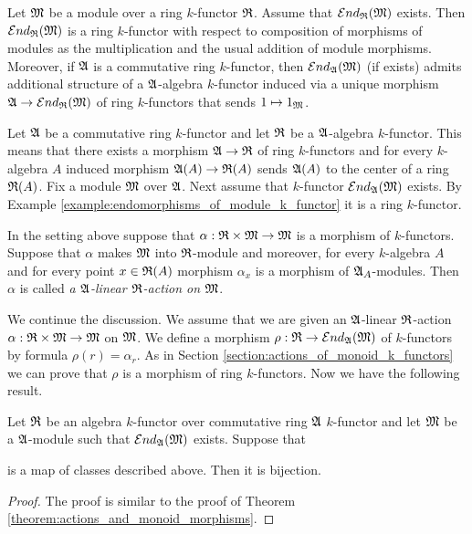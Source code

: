\begin{example}\label{example:endomorphisms_of_module_k_functor}
Let ${\mathfrak M}$ be a module over a ring $k$-functor ${\mathfrak R}$. Assume that ${\mathcal E} nd_{{\mathfrak R}}({\mathfrak M})$ exists. Then ${\mathcal E} nd_{{\mathfrak R}}({\mathfrak M})$ is a ring $k$-functor with respect to composition of morphisms of modules as the multiplication and the usual addition of module morphisms. Moreover, if ${\mathfrak A}$ is a commutative ring $k$-functor, then ${\mathcal E} nd_{{\mathfrak A}}({\mathfrak M})$ (if exists) admits additional structure of a ${\mathfrak A}$-algebra $k$-functor induced via a unique morphism ${\mathfrak A}\rightarrow {\mathcal E} nd_{{\mathfrak R}}({\mathfrak M})$ of ring $k$-functors that sends $1\mapsto 1_{{\mathfrak M}}$.
\end{example}
\noindent
Let ${\mathfrak A}$ be a commutative ring $k$-functor and let ${\mathfrak R}$ be a ${\mathfrak A}$-algebra $k$-functor. This means that there exists a morphism ${\mathfrak A}\rightarrow {\mathfrak R}$ of ring $k$-functors and for every $k$-algebra $A$ induced morphism ${\mathfrak A}(A)\rightarrow {\mathfrak R}(A)$ sends ${\mathfrak A}(A)$ to the center of a ring ${\mathfrak R}(A)$. Fix a module ${\mathfrak M}$ over ${\mathfrak A}$. Next assume that $k$-functor ${\mathcal E} nd_{{\mathfrak A}}({\mathfrak M})$ exists. By Example \ref{example:endomorphisms_of_module_k_functor} it is a ring $k$-functor.

\begin{definition}
In the setting above suppose that $\alpha:{\mathfrak R}\times {\mathfrak M}\rightarrow {\mathfrak M}$ is a morphism of $k$-functors. Suppose that $\alpha$ makes ${\mathfrak M}$ into ${\mathfrak R}$-module and moreover, for every $k$-algebra $A$ and for every point $x\in {\mathfrak R}(A)$ morphism $\alpha_x$ is a morphism of ${\mathfrak A}_A$-modules. Then $\alpha$ is called \textit{a ${\mathfrak A}$-linear ${\mathfrak R}$-action on ${\mathfrak M}$}.
\end{definition}
\noindent
We continue the discussion. We assume that we are given an ${\mathfrak A}$-linear ${\mathfrak R}$-action $\alpha:{\mathfrak R}\times {\mathfrak M} \rightarrow {\mathfrak M}$ on ${\mathfrak M}$. We define a morphism $\rho:{\mathfrak R}\rightarrow {\mathcal E} nd_{{\mathfrak A}}({\mathfrak M})$ of $k$-functors by formula $\rho(r) = \alpha_r$. As in Section \ref{section:actions_of_monoid_k_functors} we can prove that $\rho$ is a morphism of ring $k$-functors. Now we have the following result.

\begin{theorem}\label{theorem:linear_morphisms_and_homomorphisms_of_rings}
Let ${\mathfrak R}$ be an algebra $k$-functor over commutative ring ${\mathfrak A}$ $k$-functor and let ${\mathfrak M}$ be a ${\mathfrak A}$-module such that ${\mathcal E} nd_{{\mathfrak A}}({\mathfrak M})$ exists. Suppose that
\begin{center}
\end{center}
is a map of classes described above. Then it is bijection.
\end{theorem}
\begin{proof}
The proof is similar to the proof of Theorem \ref{theorem:actions_and_monoid_morphisms}.
\end{proof}

